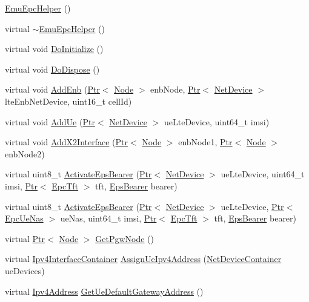 \begin{DoxyCompactItemize}
\item 
\hyperlink{classns3_1_1EmuEpcHelper_a10b42d66910c4ee73006f40eea1a1de1}{Emu\+Epc\+Helper} ()
\item 
virtual \hyperlink{classns3_1_1EmuEpcHelper_a6d85fe041fb25c277903b65dd6821d09}{$\sim$\+Emu\+Epc\+Helper} ()
\item 
virtual void \hyperlink{classns3_1_1EmuEpcHelper_ae66ac77634aad1dfb03bbe0d8a54acc1}{Do\+Initialize} ()
\item 
virtual void \hyperlink{classns3_1_1EmuEpcHelper_a4e8f0a693cb3d0ac02b558832b9da4f6}{Do\+Dispose} ()
\item 
virtual void \hyperlink{classns3_1_1EmuEpcHelper_abaff0cf3ed70c034b5e0fd22dc89a7ba}{Add\+Enb} (\hyperlink{classns3_1_1Ptr}{Ptr}$<$ \hyperlink{classns3_1_1Node}{Node} $>$ enb\+Node, \hyperlink{classns3_1_1Ptr}{Ptr}$<$ \hyperlink{classns3_1_1NetDevice}{Net\+Device} $>$ lte\+Enb\+Net\+Device, uint16\+\_\+t cell\+Id)
\item 
virtual void \hyperlink{classns3_1_1EmuEpcHelper_a8b7d0f8cf83b8b359ecd7517d73b2297}{Add\+Ue} (\hyperlink{classns3_1_1Ptr}{Ptr}$<$ \hyperlink{classns3_1_1NetDevice}{Net\+Device} $>$ ue\+Lte\+Device, uint64\+\_\+t imsi)
\item 
virtual void \hyperlink{classns3_1_1EmuEpcHelper_adeca48cbe7143128f3578b4904e02218}{Add\+X2\+Interface} (\hyperlink{classns3_1_1Ptr}{Ptr}$<$ \hyperlink{classns3_1_1Node}{Node} $>$ enb\+Node1, \hyperlink{classns3_1_1Ptr}{Ptr}$<$ \hyperlink{classns3_1_1Node}{Node} $>$ enb\+Node2)
\item 
virtual uint8\+\_\+t \hyperlink{classns3_1_1EmuEpcHelper_abe3db05cf4a2a6e1220bcceb2d0b4095}{Activate\+Eps\+Bearer} (\hyperlink{classns3_1_1Ptr}{Ptr}$<$ \hyperlink{classns3_1_1NetDevice}{Net\+Device} $>$ ue\+Lte\+Device, uint64\+\_\+t imsi, \hyperlink{classns3_1_1Ptr}{Ptr}$<$ \hyperlink{classns3_1_1EpcTft}{Epc\+Tft} $>$ tft, \hyperlink{structns3_1_1EpsBearer}{Eps\+Bearer} bearer)
\item 
virtual uint8\+\_\+t \hyperlink{classns3_1_1EmuEpcHelper_a97cf3f2565769c61b47a06bcc88780c1}{Activate\+Eps\+Bearer} (\hyperlink{classns3_1_1Ptr}{Ptr}$<$ \hyperlink{classns3_1_1NetDevice}{Net\+Device} $>$ ue\+Lte\+Device, \hyperlink{classns3_1_1Ptr}{Ptr}$<$ \hyperlink{classns3_1_1EpcUeNas}{Epc\+Ue\+Nas} $>$ ue\+Nas, uint64\+\_\+t imsi, \hyperlink{classns3_1_1Ptr}{Ptr}$<$ \hyperlink{classns3_1_1EpcTft}{Epc\+Tft} $>$ tft, \hyperlink{structns3_1_1EpsBearer}{Eps\+Bearer} bearer)
\item 
virtual \hyperlink{classns3_1_1Ptr}{Ptr}$<$ \hyperlink{classns3_1_1Node}{Node} $>$ \hyperlink{classns3_1_1EmuEpcHelper_a3442c3e768f3531ca65e23ba388420f9}{Get\+Pgw\+Node} ()
\item 
virtual \hyperlink{classns3_1_1Ipv4InterfaceContainer}{Ipv4\+Interface\+Container} \hyperlink{classns3_1_1EmuEpcHelper_aac502ef9ce75512e249e7b98f70b82a7}{Assign\+Ue\+Ipv4\+Address} (\hyperlink{classns3_1_1NetDeviceContainer}{Net\+Device\+Container} ue\+Devices)
\item 
virtual \hyperlink{classns3_1_1Ipv4Address}{Ipv4\+Address} \hyperlink{classns3_1_1EmuEpcHelper_a3bd27e33922c8053bff248c7a89f3404}{Get\+Ue\+Default\+Gateway\+Address} ()
\end{DoxyCompactItemize}
